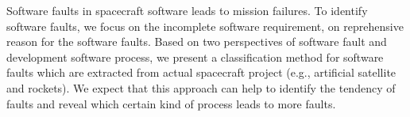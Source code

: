 Software faults in spacecraft software leads to mission failures. To identify software faults, we focus on the incomplete software requirement, on reprehensive reason for the software faults. Based on two perspectives of software fault and development software process, we present a classification method for software faults which are extracted from actual spacecraft project (e.g., artificial satellite and rockets). We expect that this approach can help to identify the tendency of faults and reveal which certain kind of process leads to more faults.